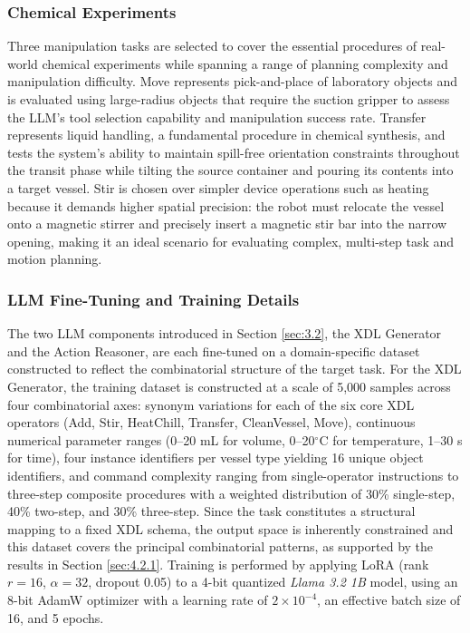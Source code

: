\documentclass{ieeeaccess}
\begin{document}
\subsubsection{Chemical Experiments}\label{sec:4.1.2}
Three manipulation tasks are selected to cover the essential procedures of real-world chemical experiments while spanning a range of planning complexity and manipulation difficulty. Move represents pick-and-place of laboratory objects and is evaluated using large-radius objects that require the suction gripper to assess the LLM's tool selection capability and manipulation success rate. Transfer represents liquid handling, a fundamental procedure in chemical synthesis, and tests the system's ability to maintain spill-free orientation constraints throughout the transit phase while tilting the source container and pouring its contents into a target vessel. Stir is chosen over simpler device operations such as heating because it demands higher spatial precision: the robot must relocate the vessel onto a magnetic stirrer and precisely insert a magnetic stir bar into the narrow opening, making it an ideal scenario for evaluating complex, multi-step task and motion planning.

\subsubsection{LLM Fine-Tuning and Training Details}\label{sec:4.1.3}
The two LLM components introduced in Section \ref{sec:3.2}, the XDL Generator and the Action Reasoner, are each fine-tuned on a domain-specific dataset constructed to reflect the combinatorial structure of the target task. For the XDL Generator, the training dataset is constructed at a scale of 5,000 samples across four combinatorial axes: synonym variations for each of the six core XDL operators (Add, Stir, HeatChill, Transfer, CleanVessel, Move), continuous numerical parameter ranges (0--20 mL for volume, 0--20$^\circ$C for temperature, 1--30 s for time), four instance identifiers per vessel type yielding 16 unique object identifiers, and command complexity ranging from single-operator instructions to three-step composite procedures with a weighted distribution of 30\% single-step, 40\% two-step, and 30\% three-step. Since the task constitutes a structural mapping to a fixed XDL schema, the output space is inherently constrained and this dataset covers the principal combinatorial patterns, as supported by the results in Section \ref{sec:4.2.1}. Training is performed by applying LoRA (rank $r = 16$, $\alpha = 32$, dropout 0.05) to a 4-bit quantized \textit{Llama 3.2 1B} model, using an 8-bit AdamW optimizer with a learning rate of $2 \times 10^{-4}$, an effective batch size of 16, and 5 epochs.
\end{document}
